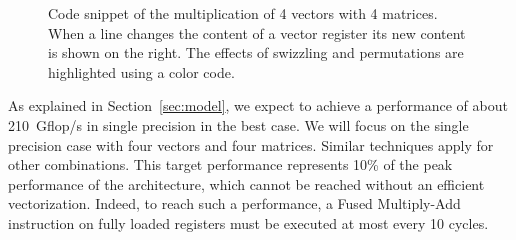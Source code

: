 \documentclass[10pt,conference,compsocconf]{IEEEtran}
\begin{document}
\begin{figure}
  \centering
{}%

\caption{Code snippet of the multiplication of 4 vectors with 4
  matrices. When a line changes the content of a vector register its
  new content is shown on the right. The effects of swizzling and
  permutations are highlighted using a color code.}
\label{code:mat_mul}
\end{figure}



As explained in Section~\ref{sec:model}, we expect to achieve a performance of
about 210~Gflop/s in single precision in the best case. We will focus
on the single precision case with four vectors and four matrices. 
Similar techniques apply for other combinations. This target
performance represents 10\% of the peak performance of the
architecture, which cannot be reached without an efficient vectorization. 
Indeed, to reach such a performance, a Fused Multiply-Add
instruction on fully loaded registers must be executed at most every
10 cycles.
\end{document}
